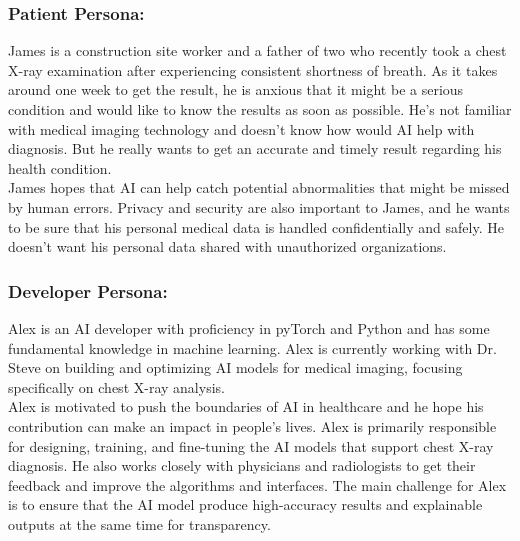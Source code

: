 \documentclass[12pt]{article}
\begin{document}
\subsubsection{Patient Persona:}
James is a construction site worker and a father of two who recently took a chest X-ray examination after experiencing consistent shortness of breath. As it takes around one week to get the result, he is anxious that it might be a serious condition and would like to know the results as soon as possible. He’s not familiar with medical imaging technology and doesn't know how would AI help with diagnosis. But he really wants to get an accurate and timely result regarding his health condition.\\
\newline
James hopes that AI can help catch potential abnormalities that might be missed by human errors. Privacy and security are also important to James, and he wants to be sure that his personal medical data is handled confidentially and safely. He doesn't want his personal data shared with unauthorized organizations. 

\subsubsection{Developer Persona:}
Alex is an AI developer with proficiency in pyTorch and Python and has some fundamental knowledge in machine learning. Alex is currently working with Dr. Steve on building and optimizing AI models for medical imaging, focusing specifically on chest X-ray analysis.\\
\newline
Alex is motivated to push the boundaries of AI in healthcare and he hope his contribution can make an impact in people's lives. Alex is primarily responsible for designing, training, and fine-tuning the AI models that support chest X-ray diagnosis. He also works closely with physicians and radiologists to get their feedback and improve the algorithms and interfaces. The main challenge for Alex is to ensure that the AI model produce high-accuracy results and explainable outputs at the same time for transparency.
\end{document}
